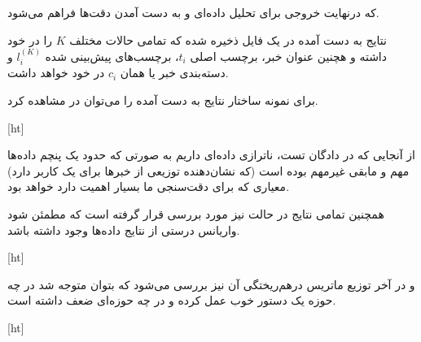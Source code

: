 که درنهایت خروجی برای تحلیل داده‌ای و به دست آمدن دقت‌ها فراهم می‌شود.


نتایج به دست آمده در یک فایل
ذخیره شده که تمامی حالات مختلف $K$  را در خود داشته و هچنین عنوان خبر، برچسب اصلی $t_i$، برچسب‌های پیش‌بینی شده $l_i^{(K)}$ و دسته‌بندی خبر یا همان $c_i$ در خود خواهد داشت.

برای نمونه ساختار نتایج به دست آمده را می‌توان در  مشاهده کرد.


[ht]

از آنجایی که در دادگان تست، ناترازی داده‌ای داریم به صورتی که حدود یک پنچم داده‌ها مهم و مابقی غیرمهم بوده است (که نشان‌دهنده توزیعی از خبرها برای یک کاربر دارد) معیاری که برای دقت‌سنجی ما بسیار اهمیت دارد
خواهد بود.

همچنین تمامی نتایج در حالت
نیز مورد بررسی قرار گرفته است که مطمئن شود واریانس درستی از نتایج داده‌ها وجود داشته باشد.



[ht]

\pagebreak

و در آخر توزیع ماتریس درهم‌ریختگی آن نیز بررسی می‌شود که بتوان متوجه شد در چه حوزه‌ یک دستور خوب عمل کرده و در چه حوزه‌ای ضعف داشته است.



[ht]

